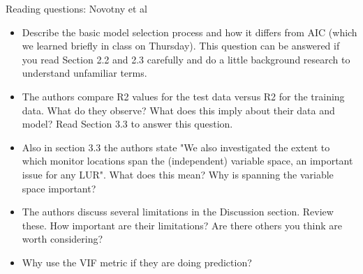 \documentclass[aspectratio=169]{beamer}
\begin{document}
\begin{frame}{Reading questions: Novotny et al}

\begin{itemize}
\item Describe the basic model selection process and how it differs from AIC (which we learned briefly in class on Thursday). This question can be answered if you read Section 2.2 and 2.3 carefully and do a little background research to understand unfamiliar terms.

\item The authors compare R2 values for the test data versus R2 for the training data. What do they observe? What does this imply about their data and model? Read Section 3.3 to answer this question.

\item Also in section 3.3 the authors state "We also investigated the extent to which monitor locations span the (independent) variable space, an important issue for any LUR". What does this mean? Why is spanning the variable space important?

\item The authors discuss several limitations in the Discussion section. Review these. How important are their limitations? Are there others you think are worth considering?

\item Why use the VIF metric if they are doing prediction?
\end{itemize}
\end{frame}
\end{document}
